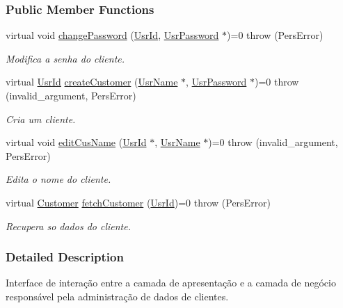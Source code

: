 \subsubsection*{Public Member Functions}
\begin{DoxyCompactItemize}
\item 
virtual void \hyperlink{classUserCusAdm_aed6d785e91a48c205df8c64736dbf3cf}{change\-Password} (\hyperlink{classUsrId}{Usr\-Id}, \hyperlink{classUsrPassword}{Usr\-Password} $\ast$)=0  throw (\-Pers\-Error)
\begin{DoxyCompactList}\small\item\em Modifica a senha do cliente. \end{DoxyCompactList}\item 
virtual \hyperlink{classUsrId}{Usr\-Id} \hyperlink{classUserCusAdm_a4775bb30caf44192349db204b95b2b2f}{create\-Customer} (\hyperlink{classUsrName}{Usr\-Name} $\ast$, \hyperlink{classUsrPassword}{Usr\-Password} $\ast$)=0  throw (invalid\-\_\-argument, Pers\-Error)
\begin{DoxyCompactList}\small\item\em Cria um cliente. \end{DoxyCompactList}\item 
virtual void \hyperlink{classUserCusAdm_a2fffe3697904fb67ca285261276e1252}{edit\-Cus\-Name} (\hyperlink{classUsrId}{Usr\-Id} $\ast$, \hyperlink{classUsrName}{Usr\-Name} $\ast$)=0  throw (invalid\-\_\-argument, Pers\-Error)
\begin{DoxyCompactList}\small\item\em Edita o nome do cliente. \end{DoxyCompactList}\item 
virtual \hyperlink{classCustomer}{Customer} \hyperlink{classUserCusAdm_a8a67bf25c965e931be912f33449e0f8a}{fetch\-Customer} (\hyperlink{classUsrId}{Usr\-Id})=0  throw (\-Pers\-Error)
\begin{DoxyCompactList}\small\item\em Recupera so dados do cliente. \end{DoxyCompactList}\end{DoxyCompactItemize}


\subsubsection{Detailed Description}
Interface de interação entre a camada de apresentação e a camada de negócio responsável pela administração de dados de clientes. 



